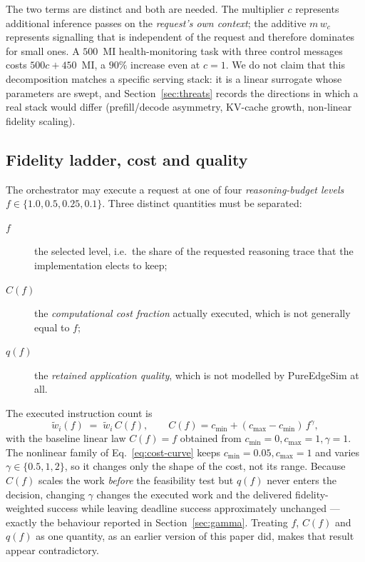 \documentclass[journal,10pt]{IEEEtran}
\begin{document}
The two terms are distinct and both are needed. The multiplier $c$ represents
additional inference passes on the \emph{request's own context}; the additive
$m\,w_c$ represents signalling that is independent of the request and therefore
dominates for small ones. A $500$~MI health-monitoring task with three control
messages costs $500c+450$~MI, a $90\%$ increase even at $c=1$. We do not claim
that this decomposition matches a specific serving stack: it is a linear
surrogate whose parameters are swept, and Section~\ref{sec:threats} records the
directions in which a real stack would differ (prefill/decode asymmetry,
KV-cache growth, non-linear fidelity scaling).

\subsection{Fidelity ladder, cost and quality}
The orchestrator may execute a request at one of four \emph{reasoning-budget
levels} $f\in\{1.0,0.5,0.25,0.1\}$. Three distinct quantities must be separated:
\begin{description}
\item[$f$] the selected level, i.e.\ the share of the requested reasoning trace
  that the implementation elects to keep;
\item[$C(f)$] the \emph{computational cost fraction} actually executed, which is
  not generally equal to $f$;
\item[$q(f)$] the \emph{retained application quality}, which is not modelled by
  PureEdgeSim at all.
\end{description}
The executed instruction count is
\begin{equation}
  \tilde w_i(f) \;=\; \tilde w_i\, C(f),\qquad
  C(f)=c_{\min}+(c_{\max}-c_{\min})\,f^{\gamma},
  \label{eq:cost-curve}
\end{equation}
with the baseline linear law $C(f)=f$ obtained from $c_{\min}=0,c_{\max}=1,\gamma=1$.
The nonlinear family of Eq.~\eqref{eq:cost-curve} keeps $c_{\min}=0.05,c_{\max}=1$ and
varies $\gamma\in\{0.5,1,2\}$, so it changes only the shape of the cost, not its
range. Because $C(f)$ scales the work \emph{before} the feasibility test but
$q(f)$ never enters the decision, changing $\gamma$ changes the executed work
and the delivered fidelity-weighted success while leaving deadline success
approximately unchanged --- exactly the behaviour reported in
Section~\ref{sec:gamma}. Treating $f$, $C(f)$ and $q(f)$ as one quantity, as an
earlier version of this paper did, makes that result appear contradictory.
\end{document}
